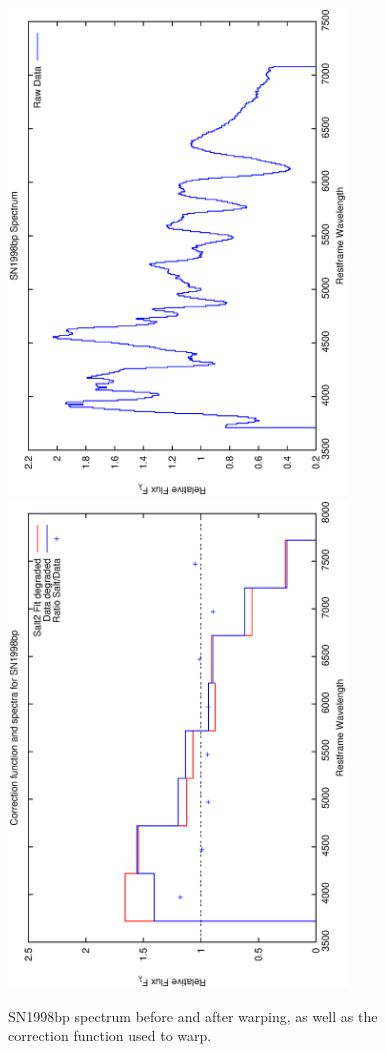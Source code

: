 \clearpage

\begin{figure}[p]
\centering
\includegraphics[angle=-90,width=0.8\textwidth]{./figures/spectrabeforeafter/SN1998bp_handpicked_v001_v027_before_after_spectra.ps}
\hfill
\includegraphics[angle=-90,width=0.8\textwidth]{./figures/corrections/SN1998bp_v001_correction.ps}
\hfill
\caption{SN1998bp spectrum before and after warping, as well as the correction function used to warp.}
\label{fig:SN1998bpfour1}
\end{figure}

